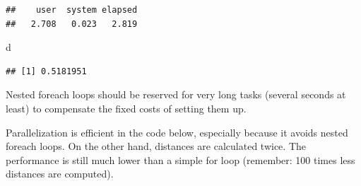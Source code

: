 \documentclass[
  12pt,
  american,
  a4paper,
  extrafontsizes,onecolumn,openright
  ]{memoir}
\newenvironment{Shaded}{\begin{snugshade}}{\end{snugshade}}
\newcommand{\AttributeTok}[1]{\textcolor[rgb]{0.77,0.63,0.00}{#1}}
\newcommand{\ControlFlowTok}[1]{\textcolor[rgb]{0.13,0.29,0.53}{\textbf{#1}}}
\newcommand{\DecValTok}[1]{\textcolor[rgb]{0.00,0.00,0.81}{#1}}
\newcommand{\FunctionTok}[1]{\textcolor[rgb]{0.00,0.00,0.00}{#1}}
\newcommand{\NormalTok}[1]{#1}
\newcommand{\OtherTok}[1]{\textcolor[rgb]{0.56,0.35,0.01}{#1}}
\newcommand{\SpecialCharTok}[1]{\textcolor[rgb]{0.00,0.00,0.00}{#1}}
\newcommand{\StringTok}[1]{\textcolor[rgb]{0.31,0.60,0.02}{#1}}
\newlength{\rf}
\begin{document}
\begin{verbatim}
##    user  system elapsed 
##   2.708   0.023   2.819
\end{verbatim}

\begin{Shaded}
\begin{Highlighting}[]
\NormalTok{d}
\end{Highlighting}
\end{Shaded}

\begin{verbatim}
## [1] 0.5181951
\end{verbatim}

\normalsize

Nested foreach loops should be reserved for very long tasks (several seconds at least) to compensate the fixed costs of setting them up.

Parallelization is efficient in the code below, especially because it avoids nested foreach loops.
On the other hand, distances are calculated twice.
The performance is still much lower than a simple for loop (remember: 100 times less distances are computed).

\scriptsize

\begin{Shaded}
\end{Shaded}
\end{document}
